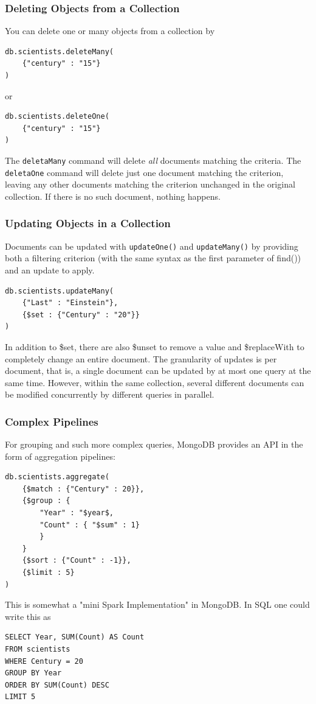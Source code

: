 \subsubsection{Deleting Objects from a Collection}
You can delete one or many objects from a collection by
\begin{lstlisting}[style=neutral]
db.scientists.deleteMany(
    {"century" : "15"}
)
\end{lstlisting}
or
\begin{lstlisting}[style=neutral]
db.scientists.deleteOne(
    {"century" : "15"}
)
\end{lstlisting}
The \texttt{deletaMany} command will delete \textit{all} documents matching the criteria. The \texttt{deletaOne} command will delete just one document matching the criterion, leaving any other documents matching the criterion unchanged in the original collection. If there is no such document, nothing happens.

\subsubsection{Updating Objects in a Collection}
Documents can be updated with \texttt{updateOne()} and \texttt{updateMany()} by providing both a filtering criterion (with the same syntax as the first parameter of find()) and an update to apply.
\begin{lstlisting}[style=neutral]
db.scientists.updateMany(
    {"Last" : "Einstein"},
    {$set : {"Century" : "20"}}
)
\end{lstlisting}
In addition to \$set, there are also \$unset to remove a value and \$replaceWith to completely change an entire document.
The granularity of updates is per document, that is, a single document can be updated by at most one query at the same time. However, within the same collection, several different documents can be modified concurrently by different queries in parallel.


\subsubsection{Complex Pipelines}

For grouping and such more complex queries, MongoDB provides an API in the form of aggregation pipelines:
\begin{lstlisting}[style=neutral]
db.scientists.aggregate(
    {$match : {"Century" : 20}},
    {$group : {
        "Year" : "$year$,
        "Count" : { "$sum" : 1}
        }
    }
    {$sort : {"Count" : -1}},
    {$limit : 5}
)
\end{lstlisting}
This is somewhat a "mini Spark Implementation" in MongoDB. In SQL one could write this as
\begin{lstlisting}[style=neutral]
SELECT Year, SUM(Count) AS Count
FROM scientists
WHERE Century = 20
GROUP BY Year
ORDER BY SUM(Count) DESC
LIMIT 5
\end{lstlisting}

